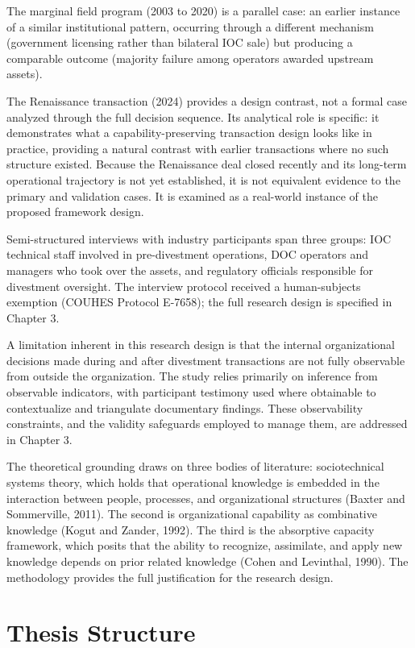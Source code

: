 The marginal field program (2003 to 2020) is a parallel case: an earlier
instance of a similar institutional pattern, occurring through a
different mechanism (government licensing rather than bilateral IOC
sale) but producing a comparable outcome (majority failure among
operators awarded upstream assets).

The Renaissance transaction (2024) provides a design contrast, not a
formal case analyzed through the full decision sequence. Its analytical
role is specific: it demonstrates what a capability-preserving
transaction design looks like in practice, providing a natural contrast
with earlier transactions where no such structure existed. Because the
Renaissance deal closed recently and its long-term operational
trajectory is not yet established, it is not equivalent evidence to the
primary and validation cases. It is examined as a real-world instance of
the proposed framework design.

Semi-structured interviews with industry participants span three groups:
IOC technical staff involved in pre-divestment operations, DOC operators
and managers who took over the assets, and regulatory officials
responsible for divestment oversight. The interview protocol received a
human-subjects exemption (COUHES Protocol E-7658); the full research
design is specified in Chapter 3.

A limitation inherent in this research design is that the internal
organizational decisions made during and after divestment transactions
are not fully observable from outside the organization. The study relies
primarily on inference from observable indicators, with participant
testimony used where obtainable to contextualize and triangulate
documentary findings. These observability constraints, and the validity
safeguards employed to manage them, are addressed in Chapter 3.

The theoretical grounding draws on three bodies of literature:
sociotechnical systems theory, which holds that operational knowledge is
embedded in the interaction between people, processes, and
organizational structures (Baxter and Sommerville, 2011). The second is
organizational capability as combinative knowledge (Kogut and Zander,
1992). The third is the absorptive capacity framework, which posits that
the ability to recognize, assimilate, and apply new knowledge depends on
prior related knowledge (Cohen and Levinthal, 1990). The methodology
provides the full justification for the research design.

\hypertarget{thesis-structure}{%
\section{Thesis Structure}\label{thesis-structure}}

